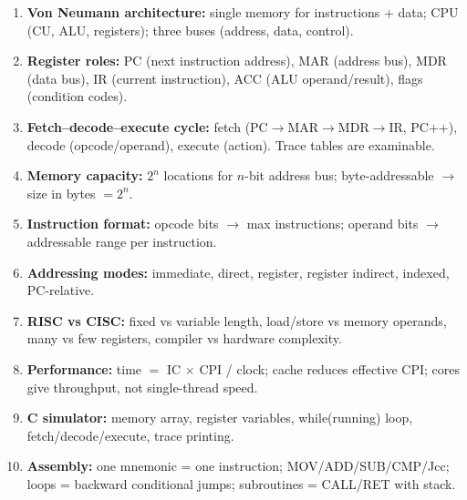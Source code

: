 \documentclass[11pt]{article}
\begin{document}
\begin{aretenir}
\begin{enumerate}
\item \textbf{Von Neumann architecture:} single memory for instructions + data; CPU (CU, ALU, registers); three buses (address, data, control).
\item \textbf{Register roles:} PC (next instruction address), MAR (address bus), MDR (data bus), IR (current instruction), ACC (ALU operand/result), flags (condition codes).
\item \textbf{Fetch–decode–execute cycle:} fetch (PC$\rightarrow$MAR$\rightarrow$MDR$\rightarrow$IR, PC++), decode (opcode/operand), execute (action). Trace tables are examinable.
\item \textbf{Memory capacity:} $2^n$ locations for $n$-bit address bus; byte-addressable $\rightarrow$ size in bytes $= 2^n$.
\item \textbf{Instruction format:} opcode bits $\rightarrow$ max instructions; operand bits $\rightarrow$ addressable range per instruction.
\item \textbf{Addressing modes:} immediate, direct, register, register indirect, indexed, PC-relative.
\item \textbf{RISC vs CISC:} fixed vs variable length, load/store vs memory operands, many vs few registers, compiler vs hardware complexity.
\item \textbf{Performance:} time $=$ IC $\times$ CPI / clock; cache reduces effective CPI; cores give throughput, not single-thread speed.
\item \textbf{C simulator:} memory array, register variables, while(running) loop, fetch/decode/execute, trace printing.
\item \textbf{Assembly:} one mnemonic = one instruction; MOV/ADD/SUB/CMP/Jcc; loops = backward conditional jumps; subroutines = CALL/RET with stack.
\end{enumerate}
\end{aretenir}
\end{document}
